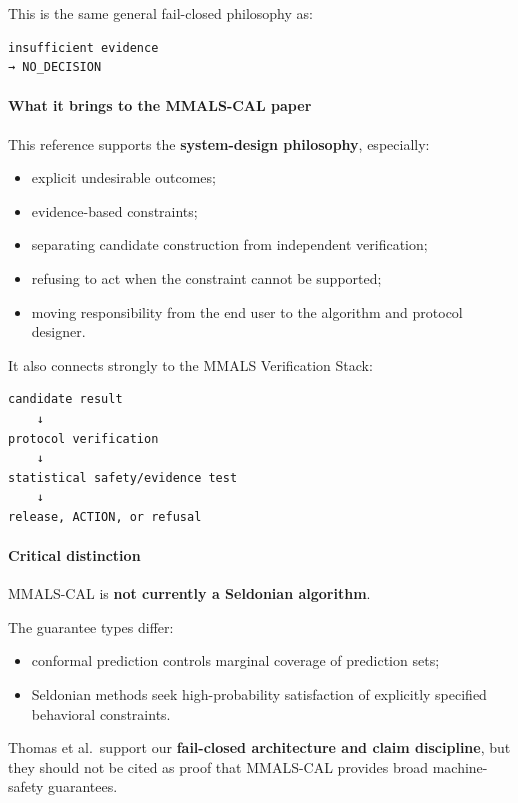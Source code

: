 This is the same general fail-closed philosophy as:

\begin{lstlisting}
insufficient evidence
→ NO_DECISION
\end{lstlisting}

\paragraph{What it brings to the MMALS-CAL paper}\label{what-it-brings-to-the-mmals-cal-paper-8}

This reference supports the \textbf{system-design philosophy}, especially:

\begin{itemize}
\tightlist
\item
  explicit undesirable outcomes;
\item
  evidence-based constraints;
\item
  separating candidate construction from independent verification;
\item
  refusing to act when the constraint cannot be supported;
\item
  moving responsibility from the end user to the algorithm and protocol designer.
\end{itemize}

It also connects strongly to the MMALS Verification Stack:

\begin{lstlisting}
candidate result
    ↓
protocol verification
    ↓
statistical safety/evidence test
    ↓
release, ACTION, or refusal
\end{lstlisting}

\paragraph{Critical distinction}\label{critical-distinction}

MMALS-CAL is \textbf{not currently a Seldonian algorithm}.

The guarantee types differ:

\begin{itemize}
\tightlist
\item
  conformal prediction controls marginal coverage of prediction sets;
\item
  Seldonian methods seek high-probability satisfaction of explicitly specified behavioral constraints.
\end{itemize}

Thomas et al.~support our \textbf{fail-closed architecture and claim discipline}, but they should not be cited as proof that MMALS-CAL provides broad machine-safety guarantees.

